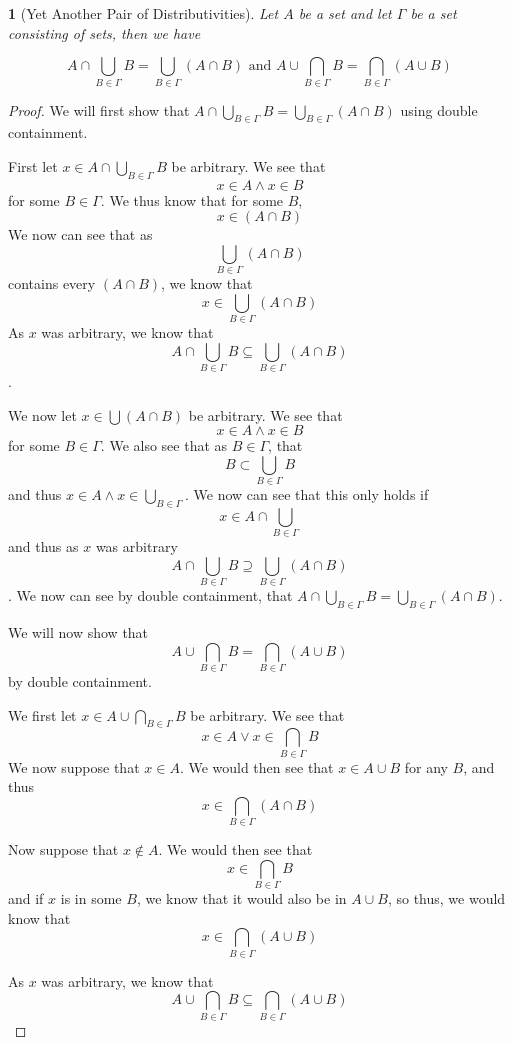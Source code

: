 \documentclass{book}
\newtheorem{majorEx}{}[section]
\begin{document}
\begin{majorEx}[Yet Another Pair of Distributivities]%
Let $A$ be a set and let $\Gamma$ be a set consisting of sets, then we have

	$$A \cap  \bigcup_{B\in \Gamma} B = \bigcup_{B\in \Gamma} (A \cap B)\text{  and  } A \cup \bigcap_{B\in \Gamma} B = \bigcap_{B\in \Gamma} (A \cup B)$$
\end{majorEx}
\begin{proof}
	We will first show that $A \cap \bigcup_{B\in \Gamma} B = \bigcup_{B\in \Gamma} (A \cap B)$ using double containment. 
    
    First let $x \in A \cap \bigcup_{B\in \Gamma} B$ be arbitrary. We see that $$x \in A \land x\in B$$ for some $B \in \Gamma$. 
    We thus know that for some $B$, $$x\in (A \cap B)$$ 
    We now can see that as $$\bigcup_{B\in \Gamma} (A \cap B)$$ contains every $(A \cap B)$, we know that $$x \in \bigcup_{B\in \Gamma} (A \cap B)$$ 
    As $x$ was arbitrary, we know that $$A \cap \bigcup_{B\in \Gamma} B \subseteq \bigcup_{B\in \Gamma} (A \cap B)$$. 
    
    We now let $x \in \bigcup (A \cap B)$ be arbitrary. 
    We see that $$x \in A \land x \in B$$ for some $B\in \Gamma$.
    We also see that as $B\in \Gamma$, that $$B \subset \bigcup_{B\in \Gamma} B$$ and thus $x \in A \land x \in \bigcup_{B\in \Gamma}$.
    We now can see that this only holds if $$x \in A \cap \bigcup_{B\in \Gamma}$$ and thus as $x$ was arbitrary $$A \cap \bigcup_{B\in \Gamma} B \supseteq \bigcup_{B\in \Gamma} (A \cap B)$$. 
    We now can see by double containment, that $A \cap \bigcup_{B\in \Gamma} B = \bigcup_{B\in \Gamma} (A \cap B)$.
    
    We will now show that $$A \cup \bigcap_{B\in \Gamma} B = \bigcap_{B\in \Gamma} (A \cup B)$$ by double containment.
    
    We first let $x \in A \cup \bigcap_{B\in \Gamma} B$ be arbitrary.
   	We see that $$x \in A \lor x \in \bigcap_{B\in \Gamma} B$$ 
    We now suppose that $x \in A$. We would then see that $x \in A \cup B$ for any $B$, and thus $$x \in \bigcap_{B\in \Gamma} (A \cap B)$$
    
    Now suppose that $x \notin A$. We would then see that $$x \in \bigcap_{B\in \Gamma} B$$ and if $x$ is in some $B$, we know that it would also be in $A \cup B$, so thus, we would know that $$x \in \bigcap_{B\in \Gamma} (A \cup B)$$
    
    As $x$ was arbitrary, we know that 
    $$A \cup \bigcap_{B\in \Gamma} B \subseteq \bigcap_{B\in \Gamma} (A \cup B)$$
    

\end{proof}
\end{document}
